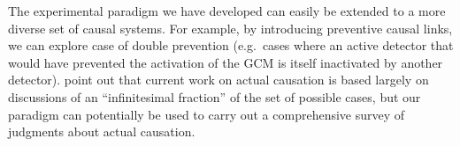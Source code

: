 \documentclass[10pt,letterpaper]{article}
\begin{document}


The experimental paradigm we have developed can easily be extended to a more diverse set of causal systems. For example, by introducing preventive causal links, we can explore case of double prevention (e.g.\ cases where an active detector that would have prevented the activation of the GCM is itself inactivated by another detector).  point out that current work on actual causation is based largely on discussions of an ``infinitesimal fraction'' of the set of possible cases, but our paradigm can potentially be used to carry out a comprehensive survey of judgments about actual causation.



\setlength{\bibleftmargin}{.125in}
\setlength{\bibindent}{-\bibleftmargin}


\end{document}
